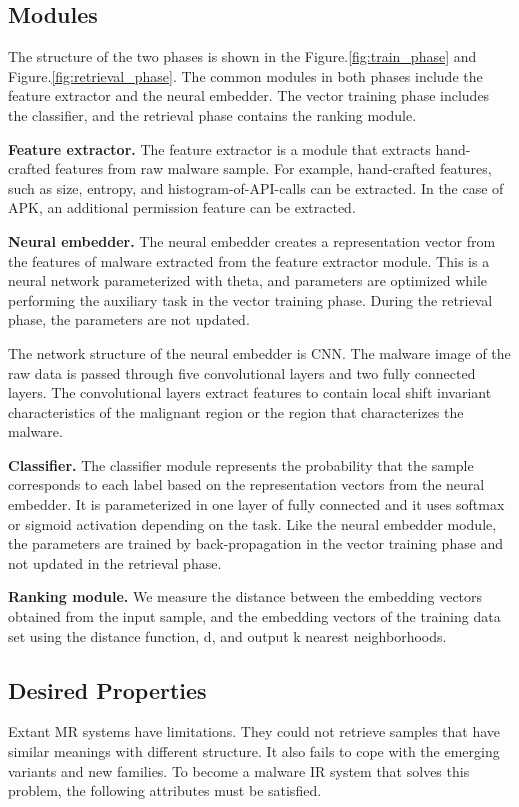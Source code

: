 \subsection{Modules}
The structure of the two phases is shown in the Figure.\ref{fig:train_phase} and Figure.\ref{fig:retrieval_phase}. The common modules in both phases include the feature extractor and the neural embedder. The vector training phase includes the classifier, and the retrieval phase contains the ranking module.

\textbf{Feature extractor. }
The feature extractor is a module that extracts hand-crafted features from raw malware sample. For example, hand-crafted features, such as size, entropy, and histogram-of-API-calls can be extracted. In the case of APK, an additional permission feature can be extracted.


\textbf{Neural embedder. }
The neural embedder creates a representation vector from the features of malware extracted from the feature extractor module. This is a neural network parameterized with theta, and parameters are optimized while performing the auxiliary task in the vector training phase. During the retrieval phase, the parameters are not updated. 

The network structure of the neural embedder is CNN. The malware image\cite{nataraj2011malware} of the raw data is passed through five convolutional layers and two fully connected layers. The convolutional layers extract features to contain local shift invariant characteristics of the malignant region or the region that characterizes the malware.

\textbf{Classifier. }
The classifier module represents the probability that the sample corresponds to each label based on the representation vectors from the neural embedder. It is parameterized in one layer of fully connected and it uses softmax or sigmoid activation depending on the task. Like the neural embedder module, the parameters are trained by back-propagation in the vector training phase and not updated in the retrieval phase.

\textbf{Ranking module. }
We measure the distance between the embedding vectors obtained from the input sample, and the embedding vectors of the training data set using the distance function, d, and output k nearest neighborhoods.



\subsection{Desired Properties}
Extant MR systems have limitations. They could not retrieve samples that have similar meanings with different structure. It also fails to cope with the emerging variants and new families. To become a malware IR system that solves this problem, the following attributes must be satisfied.

